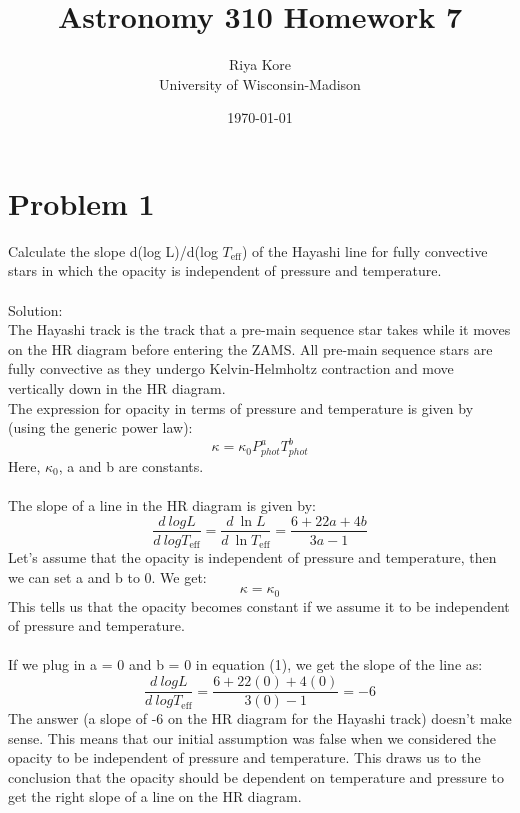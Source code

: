 \documentclass[10pt]{article}
\def \MYID{Riya Kore}
\begin{document}
\pagestyle{fancy}
\fancyhf{}
\fancyfoot[C]{\thepage}

\title{Astronomy 310 Homework 7}
\author{\MYID\\
University of Wisconsin-Madison}
\date{\today}
\maketitle

\section*{Problem 1}
Calculate the slope d(log L)/d(log $T_{\text{eff}}$) of the Hayashi line for fully convective stars in which the opacity is independent of pressure and temperature.\\
\\
Solution:\\
The Hayashi track is the track that a pre-main sequence star takes while it moves on the HR diagram before entering the ZAMS. 
All pre-main sequence stars are fully convective as they undergo Kelvin-Helmholtz contraction and move vertically down in the HR diagram.\\
The expression for opacity in terms of pressure and temperature is given by (using the generic power law):
\[ \kappa = \kappa_{0} P^{a}_{phot} T^{b}_{phot}\]
Here, $\kappa_{0}$, a and b are constants.\\ \\
The slope of a line in the HR diagram is given by:
\begin{equation}
    \frac{d \ log L}{d \ log T_{\text{eff}}} = \frac{d \ \ln{L}}{d \ \ln{T_{\text{eff}}}} = \frac{6 + 22a + 4b}{3a - 1}
\end{equation}
Let's assume that the opacity is independent of pressure and temperature, then we can set a and b to 0. We get:
\[ \kappa = \kappa_{0}\]
This tells us that the opacity becomes constant if we assume it to be independent of pressure and temperature.\\ \\
If we plug in a = 0 and b = 0 in equation (1), we get the slope of the line as:
\[ \frac{d \ log L}{d \ log T_{\text{eff}}} = \frac{6 + 22(0) + 4(0)}{3(0) - 1} = -6\]
The answer (a slope of -6 on the HR diagram for the Hayashi track) doesn't make sense. This means that our initial assumption was false when we considered the opacity to be independent of pressure and temperature. This draws us to the conclusion that the opacity should be dependent on temperature and pressure to get the right slope of a line on the HR diagram.
\end{document}
